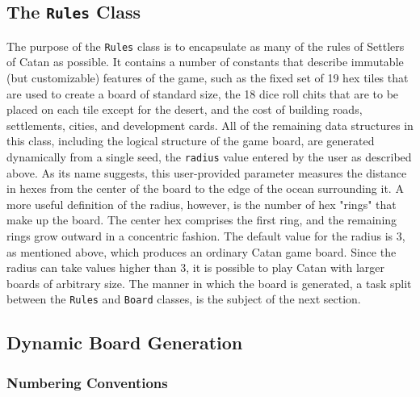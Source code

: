 \documentclass[pageno]{jpaper}
\begin{document}
\begin{doublespacing}
\hypertarget{sec:the_rules_class}{}
\subsection{The \lstinline$Rules$ Class}

The purpose of the \lstinline$Rules$ class is to encapsulate as many of the rules of Settlers of Catan as possible. It contains a number of constants that describe immutable (but customizable) features of the game, such as the fixed set of 19 hex tiles that are used to create a board of standard size, the 18 dice roll chits that are to be placed on each tile except for the desert, and the cost of building roads, settlements, cities, and development cards. All of the remaining data structures in this class, including the logical structure of the game board, are generated dynamically from a single seed, the \lstinline$radius$ value entered by the user as described above. As its name suggests, this user-provided parameter measures the distance in hexes from the center of the board to the edge of the ocean surrounding it. A more useful definition of the radius, however, is the number of hex "rings" that make up the board. The center hex comprises the first ring, and the remaining rings grow outward in a concentric fashion. The default value for the radius is 3, as mentioned above, which produces an ordinary Catan game board. Since the radius can take values higher than 3, it is possible to play Catan with larger boards of arbitrary size. The manner in which the board is generated, a task split between the \lstinline$Rules$ and \lstinline$Board$ classes, is the subject of the next section.

\hypertarget{sec:dynamic_board_generation}{}
\subsection{Dynamic Board Generation}

\hypertarget{sec:numbering_conventions}{}
\subsubsection{Numbering Conventions}


\end{doublespacing}
\end{document}
